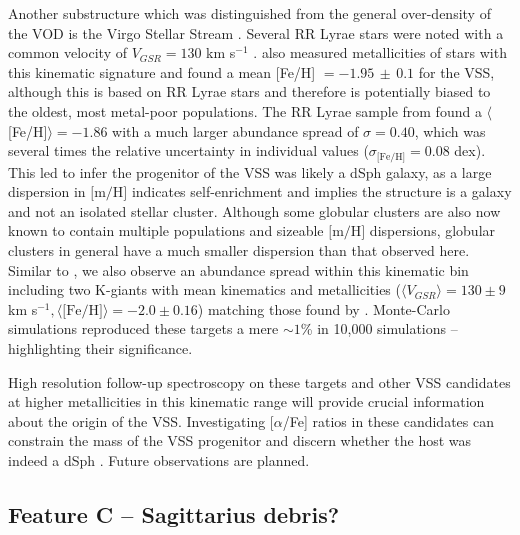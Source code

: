	Another substructure which was distinguished from the general over-density of the VOD is the Virgo Stellar Stream \citep{Duffau;et-al_2006}. Several RR Lyrae stars were noted with a common velocity of $V_{GSR} = 130$ km s$^{-1}$ \citep{Newberg;et-al_2007, Prior;et-al_2009a}. \citet{Prior;et-al_2009a} also measured metallicities of stars with this kinematic signature and found a mean [Fe/H] $= -1.95\,\pm\,0.1$ for the VSS, although this is based on RR Lyrae stars and  therefore is potentially biased to the oldest, most metal-poor populations. The RR Lyrae sample from \citet{Duffau;et-al_2006} found a $\langle$[Fe/H]$\rangle = -1.86$ with a much larger abundance spread of $\sigma = 0.40$, which was several times the relative uncertainty in individual values ($\sigma_{\mbox{[Fe/H]}} = 0.08$ dex). This led \citet{Duffau;et-al_2006} to infer the progenitor of the VSS was likely a dSph galaxy, as a large dispersion in $\mbox{[m/H]}$ indicates self-enrichment and implies the structure is a galaxy and not an isolated stellar cluster. Although some globular clusters are also now known to contain multiple populations and sizeable $\mbox{[m/H]}$ dispersions, globular clusters in general  have a much smaller dispersion than that observed here. Similar to \citet{Duffau;et-al_2006}, we  also observe an abundance spread within this kinematic bin including two K-giants with mean kinematics and metallicities ($\langle{}V_{GSR}\rangle{} = 130 \pm 9$ km s$^{-1}, \langle\mbox{[Fe/H]}\rangle = -2.0 \pm 0.16$) matching those found by \citet{Prior;et-al_2009a}. Monte-Carlo simulations reproduced these targets a mere $\sim1$\% in 10,000 simulations \--- highlighting their significance.

	High resolution follow-up spectroscopy on these targets and other VSS candidates at higher metallicities in this kinematic range will provide crucial information about the origin of the VSS.  Investigating [$\alpha$/Fe] ratios in these candidates can constrain the mass of the VSS progenitor and discern whether the host was indeed a dSph \citep{Venn;et-al_2004, Casetti-Dinescu;et-al_2009}.  Future observations are planned.

	\subsection{Feature C \--- Sagittarius debris?}
	\label{sec:ch1-feature-c}

